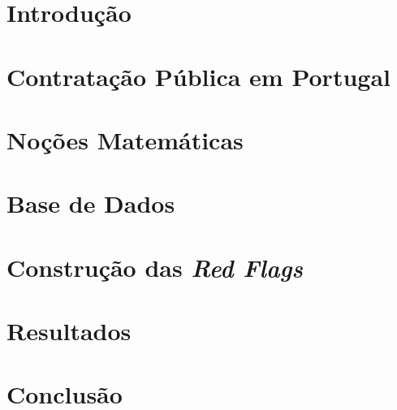 \documentclass[11pt,openright]{book}
\begin{document}
\chapter{Introdução}




\chapter{Contratação Pública em Portugal}




\chapter{Noções Matemáticas}




\chapter{Base de Dados}




\chapter{Construção das \textit{Red Flags}}
\label{ch:cap5}




\chapter{Resultados}




\chapter{Conclusão}








%	
%	
%	
\end{document}
